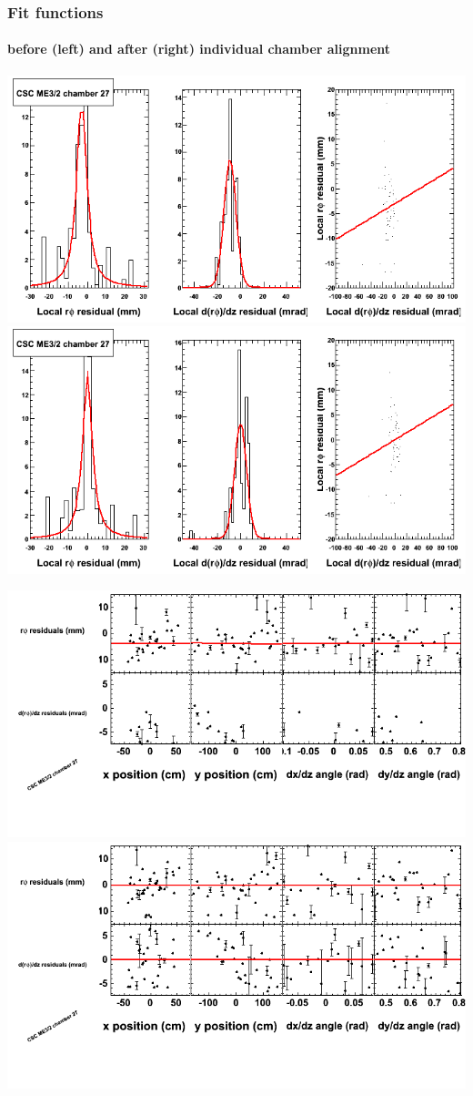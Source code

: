 \documentclass[compress]{beamer}
\begin{document}
\begin{frame}
\frametitle{Fit functions}
\framesubtitle{before (left) and after (right) individual chamber alignment}
\includegraphics[width=0.5\linewidth]{ringfits_3dof/beforefit_MEp32_27_bellcurve.png} \includegraphics[width=0.5\linewidth]{ringfits_3dof/afterfit_MEp32_27_bellcurve.png}

\includegraphics[width=0.5\linewidth]{ringfits_3dof/beforefit_MEp32_27_polynomials.png} \includegraphics[width=0.5\linewidth]{ringfits_3dof/afterfit_MEp32_27_polynomials.png}
\end{frame}
\end{document}
